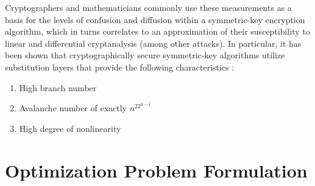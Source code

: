 \documentclass[11pt]{article}
\begin{document}
Cryptographers and mathematicians commonly use these measurements as a basis for the levels of confusion and diffusion within a symmetric-key encryption algorithm, which in turns correlates to an approximation of their susceptibility to linear and differential cryptanalysis (among other attacks). In particular, it has been shown that cryptographically secure symmetric-key algorithms utilize substitution layers that provide the following characteristics \cite{Kim90astudy}:
\begin{enumerate}
	\item High branch number
	\item Avalanche number of exactly $n^22^{n-1}$
	\item High degree of nonlinearity
\end{enumerate}

\section{Optimization Problem Formulation}
\end{document}
